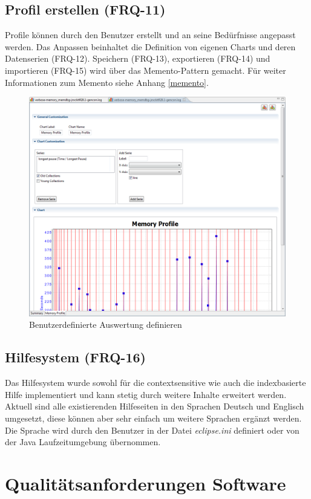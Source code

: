 \subsection{Profil erstellen (FRQ-11)}
Profile können durch den Benutzer erstellt und an seine Bedürfnisse angepasst werden. Das Anpassen beinhaltet die Definition von eigenen Charts und deren Datenserien (FRQ-12). Speichern (FRQ-13), exportieren (FRQ-14) und importieren (FRQ-15) wird über das Memento-Pattern gemacht. Für weiter Informationen zum Memento siehe Anhang \ref{memento}.
 \begin{figure}[H]
  	\centering
    	\includegraphics[width=15cm]{images/tutorial_custom_report}
        	\caption{Benutzerdefinierte Auswertung definieren}
\end{figure}

\subsection{Hilfesystem (FRQ-16)}
Das Hilfesystem wurde sowohl für die contextsensitive wie auch die indexbasierte Hilfe implementiert und kann stetig durch weitere Inhalte erweitert werden. Aktuell sind alle existierenden Hilfeseiten in den Sprachen Deutsch und Englisch umgesetzt, diese können aber sehr einfach um weitere Sprachen ergänzt werden. Die Sprache wird durch den Benutzer in der Datei \textit{eclipse.ini} definiert oder von der Java Laufzeitumgebung übernommen.

\section{Qualitätsanforderungen Software}
